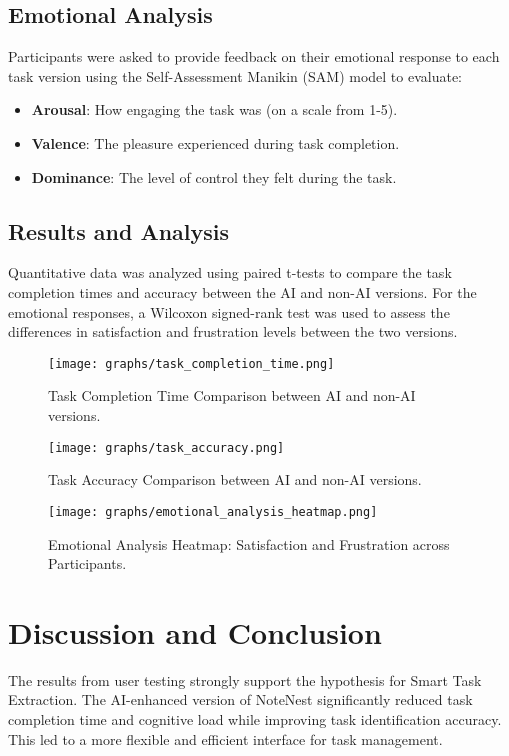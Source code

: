 \documentclass[a4paper, 12pt]{article}
\begin{document}
\subsection{Emotional Analysis}
Participants were asked to provide feedback on their emotional response to each task version using the Self-Assessment Manikin (SAM) model to evaluate:
\begin{itemize}
    \item \textbf{Arousal}: How engaging the task was (on a scale from 1-5).
    \item \textbf{Valence}: The pleasure experienced during task completion.
    \item \textbf{Dominance}: The level of control they felt during the task.
\end{itemize}

\subsection{Results and Analysis}
Quantitative data was analyzed using paired t-tests to compare the task completion times and accuracy between the AI and non-AI versions. For the emotional responses, a Wilcoxon signed-rank test was used to assess the differences in satisfaction and frustration levels between the two versions.

\begin{figure}[H]
    \centering
    \texttt{[image: graphs/task\_completion\_time.png]}
    \caption{Task Completion Time Comparison between AI and non-AI versions.}
\end{figure}

\begin{figure}[H]
    \centering
    \texttt{[image: graphs/task\_accuracy.png]}
    \caption{Task Accuracy Comparison between AI and non-AI versions.}
\end{figure}

\begin{figure}[H]
    \centering
    \texttt{[image: graphs/emotional\_analysis\_heatmap.png]}
    \caption{Emotional Analysis Heatmap: Satisfaction and Frustration across Participants.}
\end{figure}


\section{Discussion and Conclusion}
The results from user testing strongly support the hypothesis for Smart Task Extraction. The AI-enhanced version of NoteNest significantly reduced task completion time and cognitive load while improving task identification accuracy. This led to a more flexible and efficient interface for task management.
\end{document}
